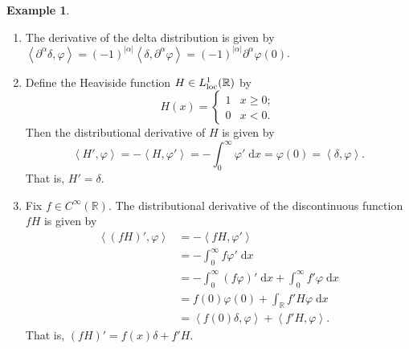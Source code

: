 \documentclass{book}
\newcommand{\bbR}{\mathbb{R}}
\renewcommand{\d}{\mathrm{d}}
\renewcommand{\phi}{\varphi}
\newcommand{\abs}[1]{\left\lvert {#1} \right\rvert}
\newcommand{\angles}[1]{\left\langle {#1} \right\rangle}
\theoremstyle{definition}
\newtheorem{example}[theorem]{Example}
\theoremstyle{remark}
\numberwithin{equation}{chapter}
\begin{document}
\begin{example}
    \begin{enumerate}[label=(\arabic*)]
        \item The derivative of the delta distribution is given by $\angles{ \partial^\alpha \delta, \phi } = (-1)^{\abs{\alpha}} \angles{ \delta,\partial^\alpha \phi } = (-1)^{\abs{\alpha}} \partial^\alpha \phi(0)$.
        
        \item Define the Heaviside function $H \in L_{\rm loc}^1(\bbR)$ by 
        \begin{equation}
            H(x) = 
            \begin{cases}
                1 & x \geq 0; \\
                0 & x < 0.
            \end{cases}
        \end{equation}
        Then the distributional derivative of $H$ is given by
        \begin{equation}
            \angles{ H',\phi } = - \angles{ H,\phi' } = - \int_0^\infty \phi' \; \d x = \phi(0) = \angles{ \delta,\phi }.
        \end{equation}
        That is, $H' = \delta$.

        \item Fix $f \in C^\infty(\bbR)$. The distributional derivative of the discontinuous function $fH$ is given by 
        \begin{equation} \begin{aligned}
            \angles{ (fH)',\phi } &= - \angles{ fH,\phi' }                                           \\
                                  &= - \int_0^\infty f\phi' \; \d x                                  \\
                                  &= - \int_0^\infty (f\phi)' \; \d x + \int_0^\infty f'\phi \; \d x \\
                                  &= f(0)\phi(0) + \int_\bbR f'H \phi \; \d x                        \\
                                  &= \angles{ f(0) \delta,\phi } + \angles{ f'H,\phi }.
        \end{aligned} \end{equation}
        That is, $(fH)' = f(x) \delta + f'H$.


\end{enumerate}
\end{example}
\end{document}
